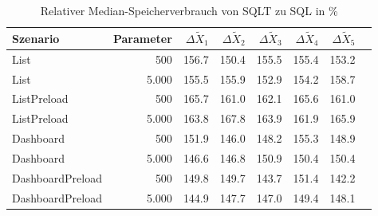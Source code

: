 
\begin{table}[ht]
\setlength{\extrarowheight}{-1pt}
\centering
\caption{Relativer Median-Speicherverbrauch von SQLT zu SQL in \%}
\begin{tabular}{lrrrrrrr}
\toprule
Szenario & Parameter & ${\Delta \tilde{X}_1}$ & ${\Delta \tilde{X}_2}$ & ${\Delta \tilde{X}_3}$ & ${\Delta \tilde{X}_4}$ & ${\Delta \tilde{X}_5}$ \\
\midrule
	List & 500 & \cellcolor{red!28}  156.7 & \cellcolor{red!25}  150.4 & \cellcolor{red!28}  155.5 & \cellcolor{red!28}  155.4 & \cellcolor{red!27}  153.2 \\
	List & 5.000 & \cellcolor{red!28}  155.5 & \cellcolor{red!28}  155.9 & \cellcolor{red!26}  152.9 & \cellcolor{red!27}  154.2 & \cellcolor{red!29}  158.7 \\
	ListPreload & 500 & \cellcolor{red!33}  165.7 & \cellcolor{red!30}  161.0 & \cellcolor{red!31}  162.1 & \cellcolor{red!33}  165.6 & \cellcolor{red!31}  161.0 \\
	ListPreload & 5.000 & \cellcolor{red!32}  163.8 & \cellcolor{red!34}  167.8 & \cellcolor{red!32}  163.9 & \cellcolor{red!31}  161.9 & \cellcolor{red!33}  165.9 \\
	Dashboard & 500 & \cellcolor{red!26}  151.9 & \cellcolor{red!23}  146.0 & \cellcolor{red!24}  148.2 & \cellcolor{red!28}  155.3 & \cellcolor{red!24}  148.9 \\
	Dashboard & 5.000 & \cellcolor{red!23}  146.6 & \cellcolor{red!23}  146.8 & \cellcolor{red!25}  150.9 & \cellcolor{red!25}  150.4 & \cellcolor{red!25}  150.4 \\
	DashboardPreload & 500 & \cellcolor{red!25}  149.8 & \cellcolor{red!25}  149.7 & \cellcolor{red!22}  143.7 & \cellcolor{red!26}  151.4 & \cellcolor{red!21}  142.2 \\
	DashboardPreload & 5.000 & \cellcolor{red!22}  144.9 & \cellcolor{red!24}  147.7 & \cellcolor{red!24}  147.0 & \cellcolor{red!25}  149.4 & \cellcolor{red!24}  148.1 \\
\bottomrule
\end{tabular}
\label{tab:relativer_speicherverbrauch_sqlt}
\end{table}
	